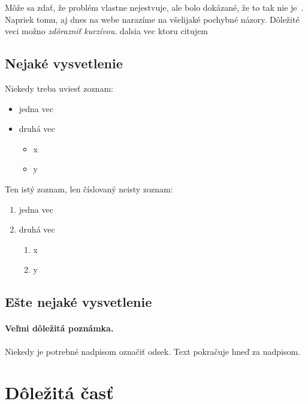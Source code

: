 \documentclass[10pt,twoside,slovak,a4paper]{coursepaper}
\begin{document}
Môže sa zdať, že problém vlastne nejestvuje\cite{Coplien:MPD}, ale bolo dokázané, že to tak nie je~\cite{Czarnecki:Staged, Czarnecki:Progress}. Napriek tomu, aj dnes na webe narazíme na všelijaké pochybné názory\cite{PLP-Framework}. Dôležité veci možno \emph{zdôrazniť kurzívou}. dalsia vec ktoru citujem \cite{Steck_Baltrunas_Elahi_Liang_Raimond_Basilico_2021}


\subsection{Nejaké vysvetlenie} \label{ina:nejake}

Niekedy treba uviesť zoznam:

\begin{itemize}
	\item jedna vec
	\item druhá vec
	      \begin{itemize}
		      \item x
		      \item y
	      \end{itemize}
\end{itemize}

Ten istý zoznam, len číslovaný neisty zoznam:

\begin{enumerate}
	\item jedna vec
	\item druhá vec
	      \begin{enumerate}
		      \item x
		      \item y
	      \end{enumerate}
\end{enumerate}


\subsection{Ešte nejaké vysvetlenie} \label{ina:este}

\paragraph{Veľmi dôležitá poznámka.}
Niekedy je potrebné nadpisom označiť odsek. Text pokračuje hneď za nadpisom.



\section{Dôležitá časť} \label{dolezita}
\end{document}
